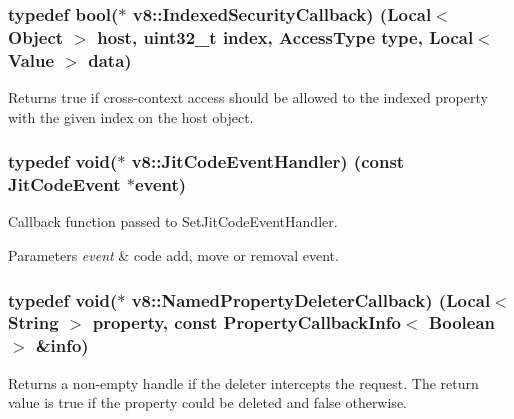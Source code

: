 \subsubsection[{Indexed\+Security\+Callback}]{\setlength{\rightskip}{0pt plus 5cm}typedef bool($\ast$ v8\+::\+Indexed\+Security\+Callback) ({\bf Local}$<$ {\bf Object} $>$ host, uint32\+\_\+t index, {\bf Access\+Type} type, {\bf Local}$<$ {\bf Value} $>$ data)}\label{namespacev8_aebbcc7837753e51112d944ad96520da1}
Returns true if cross-\/context access should be allowed to the indexed property with the given index on the host object. \hypertarget{namespacev8_a39243bc91e63d64d111452fdb98c4733}{}
\subsubsection[{Jit\+Code\+Event\+Handler}]{\setlength{\rightskip}{0pt plus 5cm}typedef void($\ast$ v8\+::\+Jit\+Code\+Event\+Handler) (const {\bf Jit\+Code\+Event} $\ast$event)}\label{namespacev8_a39243bc91e63d64d111452fdb98c4733}
Callback function passed to Set\+Jit\+Code\+Event\+Handler.


\begin{DoxyParams}{Parameters}
{\em event} & code add, move or removal event. \\
\hline
\end{DoxyParams}
\hypertarget{namespacev8_aaba861076c5b111912cfa0791d348437}{}
\subsubsection[{Named\+Property\+Deleter\+Callback}]{\setlength{\rightskip}{0pt plus 5cm}typedef void($\ast$ v8\+::\+Named\+Property\+Deleter\+Callback) ({\bf Local}$<$ {\bf String} $>$ property, const {\bf Property\+Callback\+Info}$<$ {\bf Boolean} $>$ \&info)}\label{namespacev8_aaba861076c5b111912cfa0791d348437}
Returns a non-\/empty handle if the deleter intercepts the request. The return value is true if the property could be deleted and false otherwise. \hypertarget{namespacev8_a5f6f16818a9cddacadbfe6d90ca3a6b1}{}
